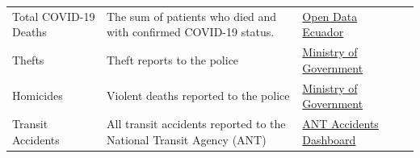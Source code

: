 \documentclass[11pt,a4paper]{article}\usepackage[]{graphicx}\usepackage[]{xcolor}
\begin{document}
\begin{table}[h]
\begin{tabular}{lp{5cm}p{5cm}l@{}}
Total COVID-19 Deaths  & The sum of patients who died and with confirmed COVID-19 status.                             & \href{https://www.datosabiertos.gob.ec/}{Open Data Ecuador}     \\
Thefts                      & Theft reports to the police                                                                                 & \href{http://cifras.ministeriodegobierno.gob.ec/comisioncifras/}{Ministry of Government} \\
Homicides                   & Violent deaths reported to the police                                                                       & \href{http://cifras.ministeriodegobierno.gob.ec/comisioncifras/}{Ministry of Government} \\
Transit Accidents           & All transit accidents reported to the National Transit Agency (ANT)                                         & \href{https://www.ant.gob.ec/visor-de-siniestralidad-estadisticas/}{ANT Accidents Dashboard}                               \\ 
\bottomrule
\end{tabular}
\end{table}
\end{document}
